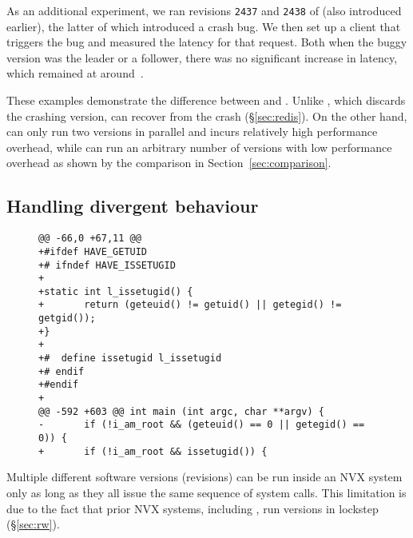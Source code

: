 As an additional experiment, we ran revisions \lstinline`2437` and
\lstinline`2438` of \lighttpd (also introduced earlier), the latter of
which introduced a crash bug.  We then set up a client that triggers the
bug and measured the latency for that request. Both when the buggy
version was the leader or a follower, there was no significant increase
in latency, which remained at around~\lighttpdnormallatency.

These examples demonstrate the difference between \mx and \varan. Unlike
\varan, which discards the crashing version, \mx can recover from the crash
(\S\ref{sec:redis}). On the other hand, \mx can only run two versions in
parallel and incurs relatively high performance overhead, while \varan can run
an arbitrary number of versions with low performance overhead as shown by the
comparison in Section~\ref{sec:comparison}.


\subsection{Handling divergent behaviour}
\label{sec:mv-execution}

\begin{figure}[t]
\begin{center}
\begin{lstlisting}[alsolanguage=diff,numbers=none,label=lst:lighttpd-suid,caption={\lighttpd SUID bit detection patch.}]
@@ -66,0 +67,11 @@
+#ifdef HAVE_GETUID
+# ifndef HAVE_ISSETUGID
+
+static int l_issetugid() {
+       return (geteuid() != getuid() || getegid() != getgid());
+}
+
+#  define issetugid l_issetugid
+# endif
+#endif
+
@@ -592 +603 @@ int main (int argc, char **argv) {
-       if (!i_am_root && (geteuid() == 0 || getegid() == 0)) {
+       if (!i_am_root && issetugid()) {
\end{lstlisting}
\end{center}
\end{figure}

Multiple different software versions (revisions) can be run inside an NVX
system only as long as they all issue the same sequence of system calls. This
limitation is due to the fact that prior NVX systems, including \mx, run
versions in lockstep (\S\ref{sec:rw}).

